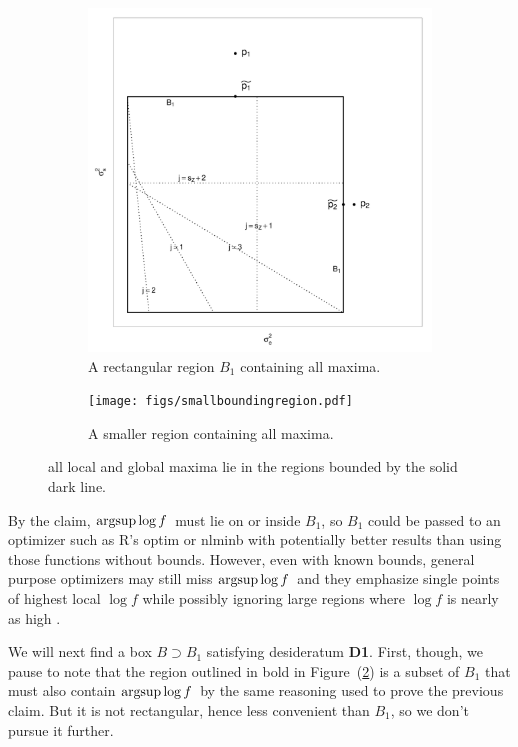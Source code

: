\documentclass{report}
\newcommand{\textcompute}{\textsf}
\newcommand{\R}{\textcompute{R}\xspace}
\newcommand{\RL}{f}
\newcommand{\logRL}{\log\RL}
\newcommand{\mrle}{$\argsup\log f$}
\newcommand{\argsup}{\operatornamewithlimits{argsup}}
\begin{document}
\begin{figure}[h]
  \begin{subfigure}{.5\textwidth}
	\centering
	\includegraphics[width=.8\linewidth]{figs/boundingbox.pdf}
	\caption{A rectangular region $B_1$ containing all maxima.}
	\label{fig:bigboundingbox}
  \end{subfigure}
  \begin{subfigure}{.5\textwidth}
	\centering
	\texttt{[image: figs/smallboundingregion.pdf]}
	\caption{A smaller region containing all maxima.}
	\label{fig:smallboundingbox}
  \end{subfigure}
  \caption{all local and global maxima lie in the regions bounded by the solid
                dark line.
               }
  \label{fig:boundingbox}
\end{figure}

By the claim, \mrle\ must lie on or inside $B_1$, so $B_1$ could be passed to an optimizer such as \R's \textsf{optim} or \textsf{nlminb} with potentially better results than using those functions without bounds.  However, even with known bounds, general purpose optimizers may still miss \mrle\ and they emphasize single points of highest local $\logRL$ while possibly ignoring large regions where $\logRL$ is nearly as high \citep[][Section 18.1.1]{hill:1965, hodges:2013}.

We will next find a box $B \supset B_1$ satisfying desideratum \textbf{D1}.  First, though, we pause to note that the region outlined in bold in Figure~(\ref{fig:smallboundingbox}) is a subset of $B_1$ that must also contain \mrle\ by the same reasoning used to prove the previous claim.  But it is not rectangular, hence less convenient than $B_1$, so we don't pursue it further.\\[5pt]
\end{document}
